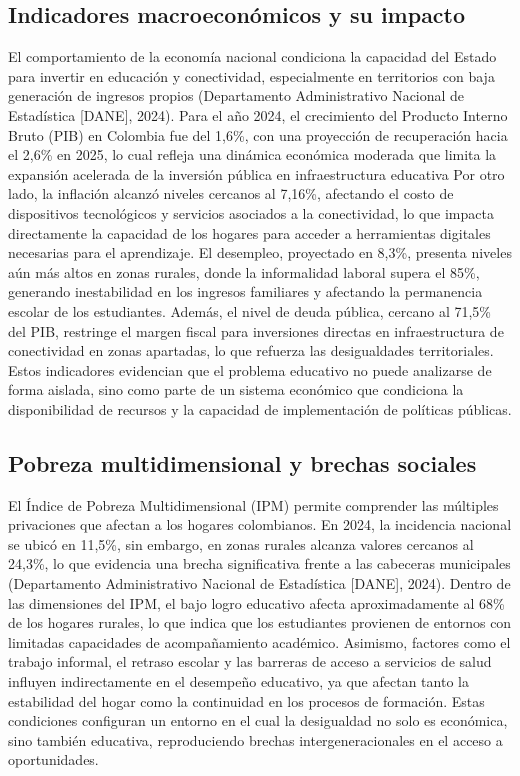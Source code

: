 \subsection{Indicadores macroeconómicos y su impacto}
El comportamiento de la economía nacional condiciona la capacidad del Estado para invertir en educación y conectividad, especialmente en territorios con baja generación de ingresos propios (Departamento Administrativo Nacional de Estadística [DANE], 2024).
Para el año 2024, el crecimiento del Producto Interno Bruto (PIB) en Colombia fue del 1,6\%, con una proyección de recuperación hacia el 2,6\% en 2025, lo cual refleja una dinámica económica moderada que limita la expansión acelerada de la inversión pública en infraestructura educativa
Por otro lado, la inflación alcanzó niveles cercanos al 7,16\%, afectando el costo de dispositivos tecnológicos y servicios asociados a la conectividad, lo que impacta directamente la capacidad de los hogares para acceder a herramientas digitales necesarias para el aprendizaje.
El desempleo, proyectado en 8,3\%, presenta niveles aún más altos en zonas rurales, donde la informalidad laboral supera el 85\%, generando inestabilidad en los ingresos familiares y afectando la permanencia escolar de los estudiantes.
Además, el nivel de deuda pública, cercano al 71,5\% del PIB, restringe el margen fiscal para inversiones directas en infraestructura de conectividad en zonas apartadas, lo que refuerza las desigualdades territoriales.
Estos indicadores evidencian que el problema educativo no puede analizarse de forma aislada, sino como parte de un sistema económico que condiciona la disponibilidad de recursos y la capacidad de implementación de políticas públicas.
\subsection{Pobreza multidimensional y brechas sociales}
El Índice de Pobreza Multidimensional (IPM) permite comprender las múltiples privaciones que afectan a los hogares colombianos. En 2024, la incidencia nacional se ubicó en 11,5\%, sin embargo, en zonas rurales alcanza valores cercanos al 24,3\%, lo que evidencia una brecha significativa frente a las cabeceras municipales (Departamento Administrativo Nacional de Estadística [DANE], 2024).
Dentro de las dimensiones del IPM, el bajo logro educativo afecta aproximadamente al 68\% de los hogares rurales, lo que indica que los estudiantes provienen de entornos con limitadas capacidades de acompañamiento académico. Asimismo, factores como el trabajo informal, el retraso escolar y las barreras de acceso a servicios de salud influyen indirectamente en el desempeño educativo, ya que afectan tanto la estabilidad del hogar como la continuidad en los procesos de formación.
Estas condiciones configuran un entorno en el cual la desigualdad no solo es económica, sino también educativa, reproduciendo brechas intergeneracionales en el acceso a oportunidades.
